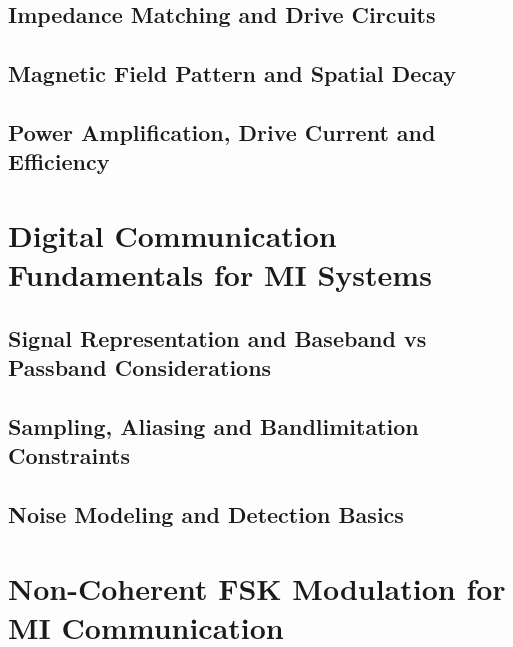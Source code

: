 \subsection{Impedance Matching and Drive Circuits}\label{subsec:matching-networks}

\subsection{Magnetic Field Pattern and Spatial Decay}\label{subsec:field-pattern}

\subsection{Power Amplification, Drive Current and Efficiency}\label{subsec:power-amplification}

\section{Digital Communication Fundamentals for MI Systems}\label{sec:digital-fundamentals}
\subsection{Signal Representation and Baseband vs Passband Considerations}\label{subsec:signal-representation}

\subsection{Sampling, Aliasing and Bandlimitation Constraints}\label{subsec:sampling}

\subsection{Noise Modeling and Detection Basics}\label{subsec:noise-detection-basics}

\section{Non-Coherent FSK Modulation for MI Communication}\label{sec:noncoherent-fsk}
